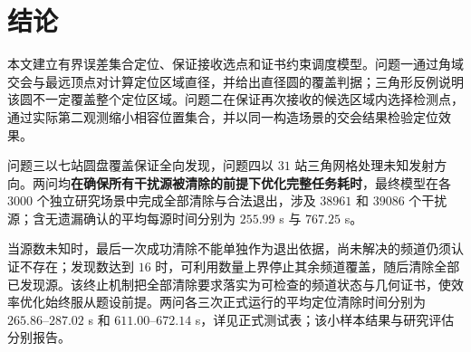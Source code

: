 \section{结论}
本文建立有界误差集合定位、保证接收选点和证书约束调度模型。问题一通过角域交会与最远顶点对计算定位区域直径，并给出直径圆的覆盖判据；三角形反例说明该圆不一定覆盖整个定位区域。问题二在保证再次接收的候选区域内选择检测点，通过实际第二观测缩小相容位置集合，并以同一构造场景的交会结果检验定位效果。

问题三以七站圆盘覆盖保证全向发现，问题四以 $31$ 站三角网格处理未知发射方向。两问均\textbf{在确保所有干扰源被清除的前提下优化完整任务耗时}，最终模型在各 $3000$ 个独立研究场景中完成全部清除与合法退出，涉及 $38961$ 和 $39086$ 个干扰源；含无遗漏确认的平均每源时间分别为 $255.99$ s 与 $767.25$ s。

当源数未知时，最后一次成功清除不能单独作为退出依据，尚未解决的频道仍须认证不存在；发现数达到 $16$ 时，可利用数量上界停止其余频道覆盖，随后清除全部已发现源。该终止机制把全部清除要求落实为可检查的频道状态与几何证书，使效率优化始终服从题设前提。两问各三次正式运行的平均定位清除时间分别为 $265.86$--$287.02$ s 和 $611.00$--$672.14$ s，详见正式测试表；该小样本结果与研究评估分别报告。
